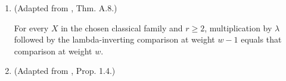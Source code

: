 \begin{theorem}
\begin{enumerate}
For two synthetic cofiber triangles $T,U$, there is an object $V$ with maps to $T.X\otimes U.Z$, $T.Y\otimes U.Y$, and $T.Z\otimes U.X$, commuting with the two tensor-product squares. Its two boundary composites are negatives of one another. Each pair of homotopy classes in the first two targets agreeing in $T.Y\otimes U.Z$ lifts to a common class on $V$.
\item (Adapted from \cite{BHS}, Thm. A.8.)\par{}

For every $X$ in the chosen classical family and $r\ge2$, multiplication by $\lambda$ followed by the lambda-inverting comparison at weight $w-1$ equals that comparison at weight $w$.
\item (Adapted from \cite{BR21}, Prop. 1.4.)\par{}


\end{enumerate}
\end{theorem}
